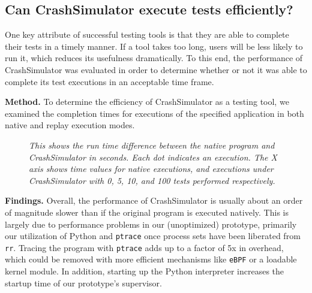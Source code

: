 \subsection{Can CrashSimulator execute tests efficiently?}
\label{sec-perf}

One key attribute of successful testing tools is that they are able to
complete their tests in a timely manner.  If a tool takes too long,
users will be less likely to run it, which reduces its
usefulness dramatically. To this end, the performance of CrashSimulator was
evaluated in order to determine whether or not it was able to complete its
test executions in an acceptable time frame.

{\bf Method.} To determine the efficiency of CrashSimulator as a testing tool,
we examined the completion
times for executions of the specified application in both
native and replay execution modes.


    \begin{figure}[t]
        \center{}
        \caption{\emph{This shows the run time difference between the
native program and CrashSimulator in seconds.  Each dot indicates an
        execution.  The X axis shows time values for native executions, and
        executions under CrashSimulator with 0, 5, 10, and 100 tests
        performed respectively.
}}
         \label{figure:performance}

    \end{figure}


{\bf Findings.} Overall, the performance of CrashSimulator is usually
about an order of magnitude slower than if the original program is executed
natively.  This is largely due to performance problems in our (unoptimized)
prototype, primarily our utilization of Python and {\tt ptrace} once
process sets have been liberated from {\tt rr}.  Tracing the program
with {\tt ptrace} adds up to a factor of 5x in overhead,  which could be
removed with more efficient mechanisms like {\tt eBPF} or a loadable kernel
module.  In addition, starting up the Python interpreter increases the
startup time of our prototype's supervisor.

